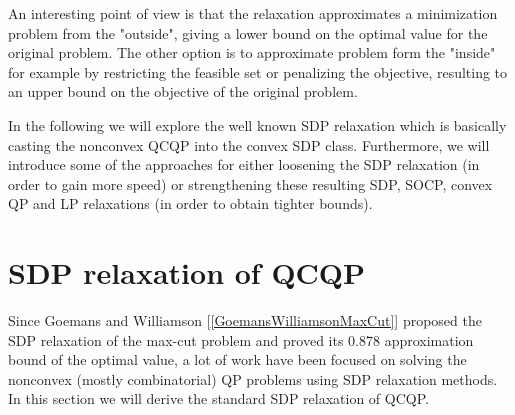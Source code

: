\documentclass[12pt]{book}
\theoremstyle{definition}
\begin{document}
An interesting point of view is that the relaxation approximates a minimization problem from the "outside", 
giving a lower bound on the optimal value for the original problem. The other option is to approximate problem form the "inside" for example by restricting the feasible set or penalizing the objective, resulting to an upper bound on the objective of the original problem. %
%
%
%
%
%
%

In the following we will explore the well known SDP  relaxation which is basically casting the nonconvex QCQP into the convex SDP class.
Furthermore, we will introduce some of the approaches for either loosening the SDP relaxation (in order to gain more speed) or strengthening these resulting SDP, SOCP, convex QP and LP relaxations (in order to obtain tighter bounds).



\section{SDP relaxation of QCQP}
\label{SectionSDPRelax}

Since Goemans and Williamson [\ref{GoemansWilliamsonMaxCut}] proposed the SDP relaxation of the max-cut problem and proved its 0.878 approximation bound of the optimal value, a lot of work have been focused on solving the nonconvex (mostly combinatorial) QP problems using SDP relaxation methods. In this section we will derive the standard SDP relaxation of QCQP. 
\end{document}
